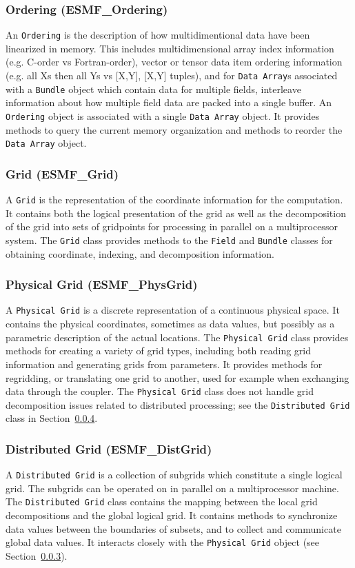 \subsubsection{Ordering (ESMF\_Ordering)}
\label{sec:ordering} 
An {\tt Ordering} is the description of how multidimentional data have been
linearized in memory.  This includes multidimensional array index information (e.g. C-order
vs Fortran-order), vector or tensor data item ordering information (e.g. all Xs then all
Ys vs [X,Y], [X,Y] tuples), and for {\tt Data Array}s associated with a {\tt Bundle} object which contain
data for multiple fields, interleave information about how multiple field data are 
packed into a single buffer.
An {\tt Ordering} object is associated with a single {\tt Data Array} object.  It provides
methods to query the current memory organization and methods to reorder the 
{\tt Data Array} object.

\subsubsection{Grid (ESMF\_Grid)}
\label{sec:grid} 
A {\tt Grid} is the representation of the coordinate information for
the computation.  It contains both the logical presentation of the grid 
as well as the
decomposition of the grid into sets of gridpoints for processing in parallel on a
multiprocessor system.  The {\tt Grid} class provides methods to the
{\tt Field} and {\tt Bundle} classes for obtaining coordinate, indexing, and 
decomposition information.

\subsubsection{Physical Grid (ESMF\_PhysGrid)}
\label{sec:physgrid} 
A {\tt Physical Grid} is a discrete representation of a continuous physical space.  It contains the physical coordinates, sometimes as data values, but possibly
as a parametric description of the actual locations.  
The {\tt Physical Grid} class provides methods for creating a variety of grid 
types, including both reading grid information
and generating grids from parameters.  It provides methods for regridding, or translating
one grid to another, used for example when exchanging data through the coupler.
The {\tt Physical Grid} class does not handle grid decomposition issues related to 
distributed processing; see the {\tt Distributed Grid} class in 
Section~\ref{sec:distgrid}.

\subsubsection{Distributed Grid (ESMF\_DistGrid)} 
\label{sec:distgrid} 
A {\tt Distributed Grid} is a collection of subgrids which
constitute a single logical grid.  The subgrids can be operated on in
parallel on a multiprocessor machine.  The {\tt Distributed Grid} class contains the mapping
between the local grid decompositions and the global logical grid. 
It contains methods to 
synchronize data values between the boundaries of subsets, and to
collect and communicate global data values.  It interacts closely with
the {\tt Physical Grid} object (see Section~\ref{sec:physgrid}).

